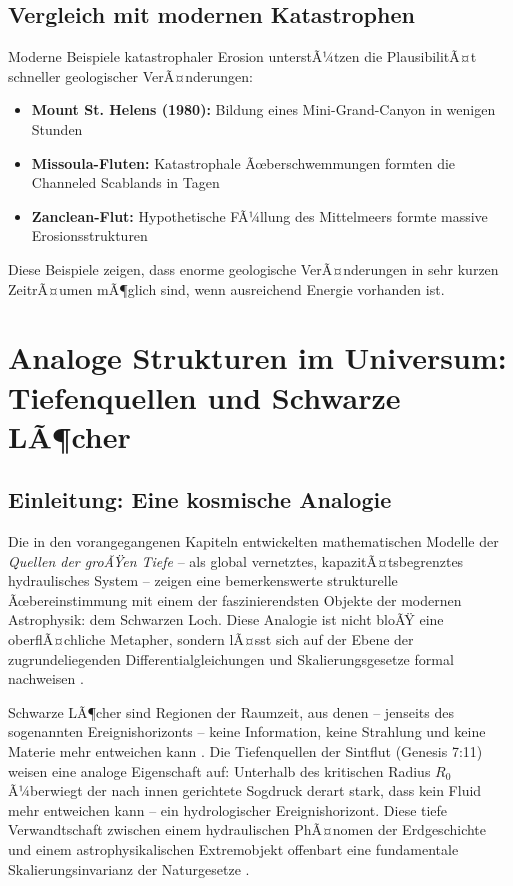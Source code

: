 ﻿\documentclass[12pt,a4paper]{report}
\begin{document}
\section{Vergleich mit modernen Katastrophen}

Moderne Beispiele katastrophaler Erosion unterstÃ¼tzen die PlausibilitÃ¤t schneller geologischer VerÃ¤nderungen:

\begin{itemize}
	\item \textbf{Mount St. Helens (1980):} Bildung eines Mini-Grand-Canyon in wenigen Stunden
	\item \textbf{Missoula-Fluten:} Katastrophale Ãœberschwemmungen formten die Channeled Scablands in Tagen
	\item \textbf{Zanclean-Flut:} Hypothetische FÃ¼llung des Mittelmeers formte massive Erosionsstrukturen
\end{itemize}

Diese Beispiele zeigen, dass enorme geologische VerÃ¤nderungen in sehr kurzen Zeit\-rÃ¤umen mÃ¶glich sind, wenn ausreichend Energie vorhanden ist.

\chapter{Analoge Strukturen im Universum: Tiefenquellen und Schwarze LÃ¶cher}
\label{sec:schwarze_loecher}

\section{Einleitung: Eine kosmische Analogie}

Die in den vorangegangenen Kapiteln entwickelten mathematischen Modelle der \textit{Quellen der groÃŸen Tiefe} -- als global vernetztes, kapazitÃ¤tsbegrenztes hydraulisches System -- zeigen eine bemerkenswerte strukturelle Ãœbereinstimmung mit einem der faszinierendsten Objekte der modernen Astrophysik: dem Schwarzen Loch. Diese Analogie ist nicht bloÃŸ eine oberflÃ¤chliche Metapher, sondern lÃ¤sst sich auf der Ebene der zugrundeliegenden Differentialgleichungen und Skalierungsgesetze formal nachweisen \cite{misner1973,penrose2004}.

Schwarze LÃ¶cher sind Regionen der Raumzeit, aus denen -- jenseits des sogenannten Ereignishorizonts -- keine Information, keine Strahlung und keine Materie mehr entweichen kann \cite{schwarzschild1916,hawking1975}. Die Tiefenquellen der Sintflut (Genesis 7:11) weisen eine analoge Eigenschaft auf: Unterhalb des kritischen Radius $R_0$ Ã¼berwiegt der nach innen gerichtete Sogdruck derart stark, dass kein Fluid mehr entweichen kann -- ein hydrologischer Ereignishorizont. Diese tiefe Verwandtschaft zwischen einem hydraulischen PhÃ¤nomen der Erdgeschichte und einem astrophysikalischen Extremobjekt offenbart eine fundamentale Skalierungsinvarianz der Naturgesetze \cite{penrose1965,lamb1932}.
\end{document}
